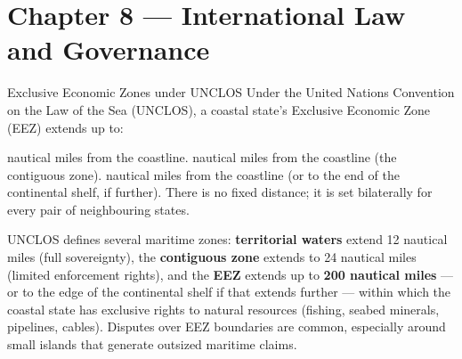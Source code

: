 \section{Chapter 8 — International Law and Governance}

\begin{question}[type=mc]{Exclusive Economic Zones under UNCLOS}
Under the United Nations Convention on the Law of the Sea (UNCLOS), a
coastal state's Exclusive Economic Zone (EEZ) extends up to:
\begin{choices}
   nautical miles from the coastline.
   nautical miles from the coastline (the contiguous zone).
   nautical miles from the coastline (or to the end of the
                 continental shelf, if further).
  \choice        There is no fixed distance; it is set bilaterally for every
                 pair of neighbouring states.
\end{choices}
\begin{solution}
  UNCLOS defines several maritime zones: \textbf{territorial waters} extend
  12 nautical miles (full sovereignty), the \textbf{contiguous zone} extends
  to 24 nautical miles (limited enforcement rights), and the \textbf{EEZ}
  extends up to \textbf{200 nautical miles} --- or to the edge of the
  continental shelf if that extends further --- within which the coastal
  state has exclusive rights to natural resources (fishing, seabed minerals,
  pipelines, cables). Disputes over EEZ boundaries are common, especially
  around small islands that generate outsized maritime claims.
\end{solution}
\end{question}

